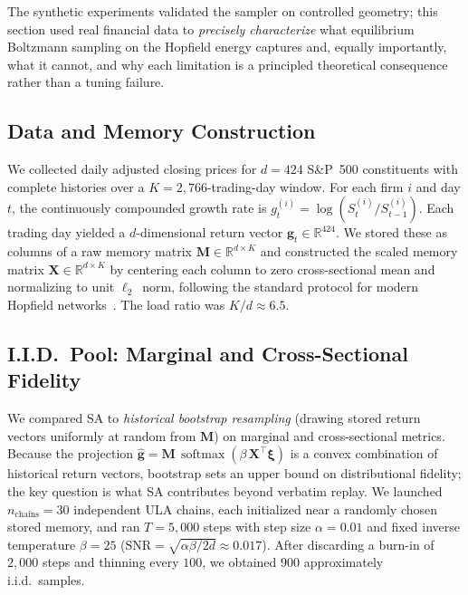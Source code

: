 The synthetic experiments validated the sampler on controlled geometry; this section used real financial data to \emph{precisely characterize} what equilibrium Boltzmann sampling on the Hopfield energy captures and, equally importantly, what it cannot, and why each limitation is a principled theoretical consequence rather than a tuning failure.

\subsection{Data and Memory Construction}

We collected daily adjusted closing prices for $d=424$ S\&P~500 constituents with complete histories over a $K=2{,}766$-trading-day window. For each firm $i$ and day $t$, the continuously compounded growth rate is $g^{(i)}_t = \log(S^{(i)}_t / S^{(i)}_{t-1})$. Each trading day yielded a $d$-dimensional return vector $\mathbf{g}_t \in \mathbb{R}^{424}$. We stored these as columns of a raw memory matrix $\mathbf{M}\in\mathbb{R}^{d\times K}$ and constructed the scaled memory matrix $\mathbf{X}\in\mathbb{R}^{d\times K}$ by centering each column to zero cross-sectional mean and normalizing to unit $\ell_2$~norm, following the standard protocol for modern Hopfield networks~\cite{ramsauerHopfieldNetworksAll2021}. The load ratio was $K/d \approx 6.5$.

\subsection{I.I.D.\ Pool: Marginal and Cross-Sectional Fidelity}

We compared SA to \emph{historical bootstrap resampling} (drawing stored return vectors uniformly at random from $\mathbf{M}$) on marginal and cross-sectional metrics. Because the projection $\hat{\mathbf{g}}=\mathbf{M}\,\operatorname{softmax}(\beta\,\mathbf{X}^\top\boldsymbol{\xi})$ is a convex combination of historical return vectors, bootstrap sets an upper bound on distributional fidelity; the key question is what SA contributes beyond verbatim replay. We launched $n_{\text{chains}}=30$ independent ULA chains, each initialized near a randomly chosen stored memory, and ran $T=5{,}000$ steps with step size $\alpha=0.01$ and fixed inverse temperature $\beta=25$ ($\mathrm{SNR}=\sqrt{\alpha\beta/2d}\approx 0.017$). After discarding a burn-in of $2{,}000$ steps and thinning every $100$, we obtained $900$ approximately i.i.d.\ samples.


